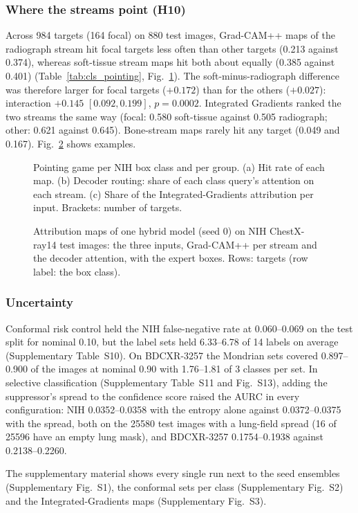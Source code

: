 \subsubsection{Where the streams point (H10)}
Across 984 targets (164 focal) on 880 test images, Grad-CAM++ maps of the radiograph stream hit focal targets less often than other targets
(0.213 against 0.374), whereas soft-tissue stream maps hit both about equally (0.385 against 0.401) (Table~\ref{tab:cls_pointing},
Fig.~\ref{fig:cls_pointing}). The soft-minus-radiograph difference was therefore larger for focal targets ($+0.172$) than for the others
($+0.027$): interaction $+0.145$ $[0.092,0.199]$, $p=0.0002$. Integrated Gradients ranked the two streams the same way (focal: 0.580
soft-tissue against 0.505 radiograph; other: 0.621 against 0.645). Bone-stream maps rarely hit any target (0.049 and 0.167).
Fig.~\ref{fig:cls_maps} shows examples.

\begin{table}[htbp]
\centering\footnotesize
\caption{H10: pointing-game hit rates on the NIH expert boxes, means over targets of the per-target means over the five hybrid models;
tolerance 15\,px at 256\,px. Last row: soft-tissue minus radiograph stream (Grad-CAM++) and the interaction with its 95\,\% image-cluster
bootstrap interval.}
\label{tab:cls_pointing}
\end{table}

\begin{figure}[htbp]
\centering
{}
\caption{Pointing game per NIH box class and per group. (a) Hit rate of each map. (b) Decoder routing: share of each class query's
attention on each stream. (c) Share of the Integrated-Gradients attribution per input. Brackets: number of targets.}
\label{fig:cls_pointing}
\end{figure}

\begin{figure}[htbp]
\centering
{}
\caption{Attribution maps of one hybrid model (seed 0) on NIH ChestX-ray14 test images: the three inputs, Grad-CAM++ per stream and the
decoder attention, with the expert boxes. Rows: targets (row label: the box class).}
\label{fig:cls_maps}
\end{figure}

\subsubsection{Uncertainty}
Conformal risk control held the NIH false-negative rate at 0.060--0.069 on the test split for nominal 0.10, but the label sets held 6.33--6.78
of 14 labels on average (Supplementary Table~S10). On BDCXR-3257 the Mondrian sets covered 0.897--0.900 of the images at nominal 0.90
with 1.76--1.81 of 3 classes per set. In selective classification (Supplementary Table~S11 and Fig.~S13), adding the suppressor's spread to
the confidence score raised the AURC in every configuration: NIH 0.0352--0.0358 with the entropy alone against 0.0372--0.0375 with the spread,
both on the \num{25580} test images with a lung-field spread (16 of \num{25596} have an empty lung mask), and BDCXR-3257 0.1754--0.1938
against 0.2138--0.2260.

The supplementary material shows every single run next to the seed ensembles (Supplementary Fig.~S1), the conformal sets per
class (Supplementary Fig.~S2) and the Integrated-Gradients maps (Supplementary Fig.~S3).
